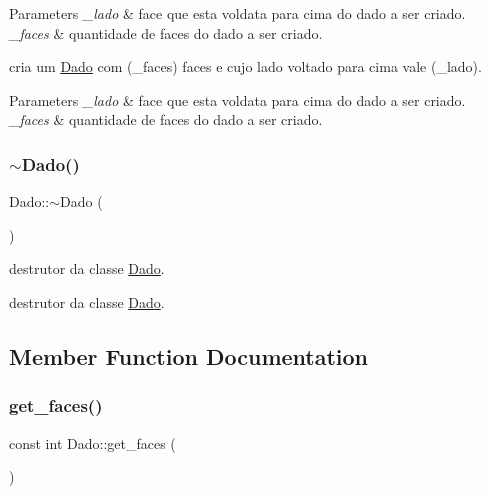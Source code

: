 \begin{DoxyParams}{Parameters}
{\em \+\_\+lado} & face que esta voldata para cima do dado a ser criado. \\
\hline
{\em \+\_\+faces} & quantidade de faces do dado a ser criado.\\
\hline
\end{DoxyParams}
cria um \mbox{\hyperlink{class_dado}{Dado}} com (\+\_\+faces) faces e cujo lado voltado para cima vale (\+\_\+lado). 
\begin{DoxyParams}{Parameters}
{\em \+\_\+lado} & face que esta voldata para cima do dado a ser criado. \\
\hline
{\em \+\_\+faces} & quantidade de faces do dado a ser criado. \\
\hline
\end{DoxyParams}
\mbox{\label{class_dado_acecf4b980bab4db4ba446de3bc915205}} 
\subsubsection{\texorpdfstring{$\sim$\+Dado()}{~Dado()}}
{\footnotesize\ttfamily Dado\+::$\sim$\+Dado (\begin{DoxyParamCaption}{ }\end{DoxyParamCaption})}



destrutor da classe \mbox{\hyperlink{class_dado}{Dado}}. 

destrutor da classe \mbox{\hyperlink{class_dado}{Dado}}. 

\subsection{Member Function Documentation}
\mbox{\label{class_dado_aaac9a6b7c544b9aa70021550b2d3e5cb}} 
\subsubsection{\texorpdfstring{get\+\_\+faces()}{get\_faces()}}
{\footnotesize\ttfamily const int Dado\+::get\+\_\+faces (\begin{DoxyParamCaption}{ }\end{DoxyParamCaption})}



